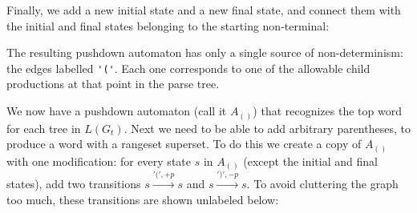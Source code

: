 \documentclass[acmsmall,review,anonymous]{acmart}\settopmatter{printfolios=true,printccs=false,printacmref=false}
\begin{document}
\noindent Finally, we add a new initial state and a new final state, and connect them with the initial and final states belonging to the starting non-terminal:

\begin{center}
\end{center}

\noindent The resulting pushdown automaton has only a single source of non-determinism: the edges labelled \verb|'('|. Each one corresponds to one of the allowable child productions at that point in the parse tree.

We now have a pushdown automaton (call it $A_{()}$) that recognizes the top word for each tree in $L(G_t)$. Next we need to be able to add arbitrary parentheses, to produce a word with a rangeset superset. To do this we create a copy of $A_{()}$ with one modification: for every state $s$ in $A_{()}$ (except the initial and final states), add two transitions $s \xrightarrow{'(', +p} s$ and $s \xrightarrow{')', -p} s$. To avoid cluttering the graph too much, these transitions are shown unlabeled below:
\end{document}

